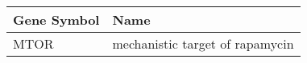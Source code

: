 \begin{tabular}{ll}
\toprule
Gene Symbol &                            Name \\
\midrule
       MTOR & mechanistic target of rapamycin \\
\bottomrule
\end{tabular}

